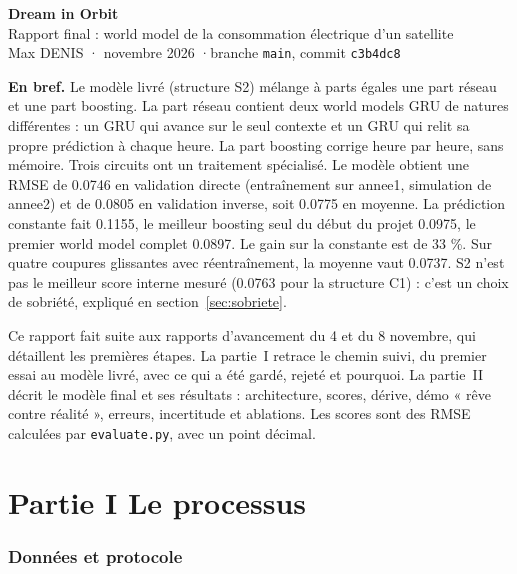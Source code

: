 \documentclass[11pt,a4paper]{article}
\newcommand{\code}[1]{\texttt{#1}}
\begin{document}
\thispagestyle{plain}
\begin{center}
  {\LARGE\bfseries Dream in Orbit}\\[4pt]
  {\large Rapport final : world model de la consommation électrique d'un satellite}\\[8pt]
  {\color{encre2}Max DENIS \quad· novembre 2026 \quad·\quad branche \code{main}, commit \code{c3b4dc8}}
\end{center}

\vspace{4pt}
\noindent\colorbox{fond}{\parbox{\dimexpr\linewidth-2\fboxsep}{\small
\textbf{En bref.} Le modèle livré (structure S2) mélange à parts égales une part réseau et une part boosting. La part réseau contient deux world models GRU de natures différentes : un GRU qui avance sur le seul contexte et un GRU qui relit sa propre prédiction à chaque heure. La part boosting corrige heure par heure, sans mémoire. Trois circuits ont un traitement spécialisé. Le modèle obtient une RMSE de 0.0746 en validation directe (entraînement sur annee1, simulation de annee2) et de 0.0805 en validation inverse, soit 0.0775 en moyenne. La prédiction constante fait 0.1155, le meilleur boosting seul du début du projet 0.0975, le premier world model complet 0.0897. Le gain sur la constante est de 33 \%. Sur quatre coupures glissantes avec réentraînement, la moyenne vaut 0.0737. S2 n'est pas le meilleur score interne mesuré (0.0763 pour la structure C1) : c'est un choix de sobriété, expliqué en section~\ref{sec:sobriete}.}}

\vspace{6pt}
Ce rapport fait suite aux rapports d'avancement du 4 et du 8 novembre, qui détaillent les premières étapes. La partie~I retrace le chemin suivi, du premier essai au modèle livré, avec ce qui a été gardé, rejeté et pourquoi. La partie~II décrit le modèle final et ses résultats : architecture, scores, dérive, démo « rêve contre réalité », erreurs, incertitude et ablations. Les scores sont des RMSE calculées par \code{evaluate.py}, avec un point décimal.

\part*{Partie I \quad Le processus}

\section{Données et protocole}
\end{document}
